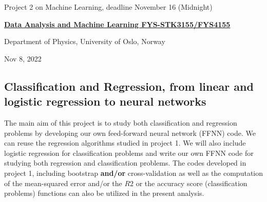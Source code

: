 \documentclass[%
oneside,                 %
final,                   %
10pt]{article}
\begin{document}

\newcommand{\exercisesection}[1]{\subsection*{#1}}






\thispagestyle{empty}

\begin{center}
{\LARGE\bf
\begin{spacing}{1.25}
Project 2 on Machine Learning, deadline November 16 (Midnight)
\end{spacing}
}
\end{center}


\begin{center}
{\bf \href{{http://www.uio.no/studier/emner/matnat/fys/FYS3155/index-eng.html}}{Data Analysis and Machine Learning FYS-STK3155/FYS4155}}
\end{center}

    \begin{center}
\centerline{{\small Department of Physics, University of Oslo, Norway}}
\end{center}
    

\begin{center}
Nov 8, 2022
\end{center}

\vspace{1cm}


\subsection{Classification and Regression, from linear and logistic regression to neural networks}

The main aim of this project is to study both classification and
regression problems by developing our own feed-forward neural network
(FFNN) code. We can reuse the regression algorithms studied in project
1. We will also include logistic regression for classification
problems and write our own FFNN code for studying both regression and
classification problems.  The codes developed in project 1, including
bootstrap \textbf{and/or} cross-validation as well as the computation of the
mean-squared error and/or the $R2$ or the accuracy score
(classification problems) functions can also be utilized in the
present analysis.
\end{document}
